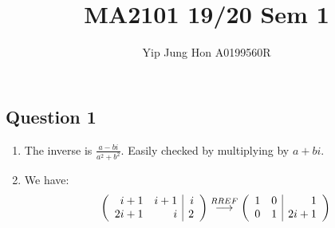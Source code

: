\documentclass{article}
\title{MA2101 19/20 Sem 1}
\author{Yip Jung Hon A0199560R}
\newcommand{\grstep}[2][\relax]{%
   \ensuremath{\mathrel{
       {\mathop{\longrightarrow}\limits^{#2\mathstrut}_{
                                     \begin{subarray}{l} #1 \end{subarray}}}}}}
\begin{document}
\maketitle
\subsection*{Question 1}
\begin{enumerate}[label=(\alph*)]
    \item The inverse is $\frac{a-bi}{a^2+b^2}$. Easily checked by multiplying by $a+bi$.
    \item We have:
    \begin{equation*}
        \left(\begin{array}{rr|r}
    i + 1 & i + 1 & i \\
    2 i + 1 & i & 2
    \end{array}\right)  \grstep[]{RREF} \left(\begin{array}{rr|r}
    1 & 0 & 1 \\
    0 & 1 & 2 i + 1
    \end{array}\right)
        \end{equation*}
\end{enumerate}
\end{document}
